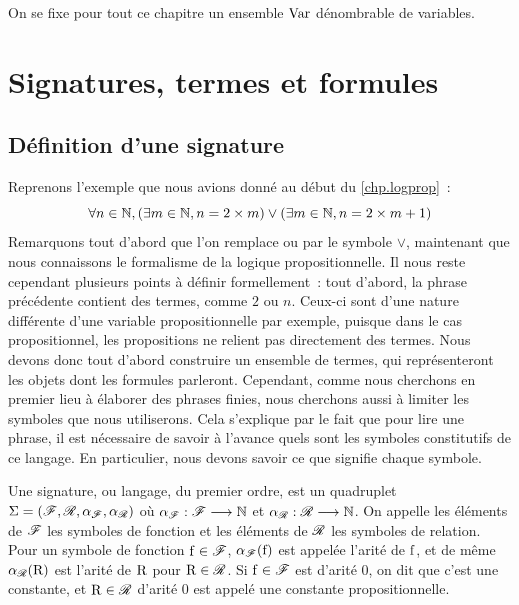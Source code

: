 On se fixe pour tout ce chapitre un ensemble $\operatorname{Var}$ dénombrable de variables.

\section{Signatures, termes et formules}

\subsection{Définition d'une signature}\label{subsec.signature}

Reprenons l'exemple que nous avions donné au début du \cref{chp.logprop}~:
\[\forall n \in \mathbb N, (\exists m \in \mathbb N, n = 2\times m) \lor
(\exists m \in \mathbb N, n = 2 \times m + 1)\]
Remarquons tout d'abord que l'on remplace \og ou\fg{} par le symbole $\lor$,
maintenant que nous connaissons le formalisme de la logique propositionnelle.
Il nous reste cependant plusieurs points à définir formellement~: tout d'abord,
la phrase précédente contient des termes, comme $2$ ou $n$. Ceux-ci sont d'une
nature différente d'une variable propositionnelle par exemple, puisque dans le
cas propositionnel, les propositions ne relient pas directement des termes.
Nous devons donc tout d'abord construire un ensemble de
termes, qui représenteront les objets dont les formules parleront. Cependant,
comme nous cherchons en premier lieu à élaborer des phrases finies, nous
cherchons aussi à limiter les symboles que nous utiliserons. Cela s'explique par
le fait que pour lire une phrase, il est nécessaire de savoir à l'avance quels
sont les symboles constitutifs de ce langage. En particulier, nous devons savoir
ce que signifie chaque symbole.

\begin{definition}[Signature]
  Une signature, ou langage, du premier ordre, est un quadruplet
  $\Sigma = (\mathscr F,\mathscr R, \alpha_{\mathscr F},\alpha_{\mathscr R})$ où
  $\alpha_{\mathscr F} : \displaystyle \mathscr F \longrightarrow \mathbb N$ et
  $\alpha_{\mathscr R} : \displaystyle \mathscr R \longrightarrow \mathbb N$. On appelle les éléments de $\mathscr F$
  les symboles de fonction et les éléments de $\mathscr R$ les symboles de
  relation. Pour un symbole de fonction $\mathrm{f}\in\mathscr F$, $\alpha_{\mathscr F}(\mathrm{f})$
  est appelée l'arité de $\mathrm{f}$, et de même $\alpha_{\mathscr R}(\mathrm{R})$ est l'arité de
  $\mathrm{R}$ pour $\mathrm{R}\in\mathscr R$. Si $\mathrm{f}\in\mathscr F$ est d'arité $0$, on
  dit que c'est une constante, et $\mathrm{R} \in \mathscr R$ d'arité $0$ est appelé
  une constante propositionnelle.
\end{definition}

